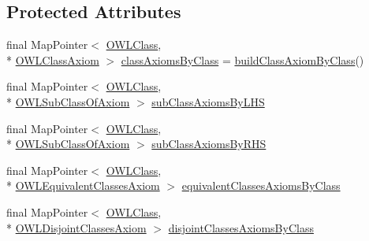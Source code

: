 \subsection*{Protected Attributes}
\begin{DoxyCompactItemize}
\item 
final Map\-Pointer$<$ \hyperlink{interfaceorg_1_1semanticweb_1_1owlapi_1_1model_1_1_o_w_l_class}{O\-W\-L\-Class}, \\*
\hyperlink{interfaceorg_1_1semanticweb_1_1owlapi_1_1model_1_1_o_w_l_class_axiom}{O\-W\-L\-Class\-Axiom} $>$ \hyperlink{classuk_1_1ac_1_1manchester_1_1cs_1_1owl_1_1owlapi_1_1_abstract_internals_impl_a3a600d063d1c9d76bd3a5fbb70aaff59}{class\-Axioms\-By\-Class} = \hyperlink{classuk_1_1ac_1_1manchester_1_1cs_1_1owl_1_1owlapi_1_1_abstract_internals_impl_a432bc10c49231eb4e30deec06401e08b}{build\-Class\-Axiom\-By\-Class}()
\item 
final Map\-Pointer$<$ \hyperlink{interfaceorg_1_1semanticweb_1_1owlapi_1_1model_1_1_o_w_l_class}{O\-W\-L\-Class}, \\*
\hyperlink{interfaceorg_1_1semanticweb_1_1owlapi_1_1model_1_1_o_w_l_sub_class_of_axiom}{O\-W\-L\-Sub\-Class\-Of\-Axiom} $>$ \hyperlink{classuk_1_1ac_1_1manchester_1_1cs_1_1owl_1_1owlapi_1_1_abstract_internals_impl_a114f0f04f66907f24cdfc6000e0925bc}{sub\-Class\-Axioms\-By\-L\-H\-S}
\item 
final Map\-Pointer$<$ \hyperlink{interfaceorg_1_1semanticweb_1_1owlapi_1_1model_1_1_o_w_l_class}{O\-W\-L\-Class}, \\*
\hyperlink{interfaceorg_1_1semanticweb_1_1owlapi_1_1model_1_1_o_w_l_sub_class_of_axiom}{O\-W\-L\-Sub\-Class\-Of\-Axiom} $>$ \hyperlink{classuk_1_1ac_1_1manchester_1_1cs_1_1owl_1_1owlapi_1_1_abstract_internals_impl_a7ea52a161f47ad10fea2017ee4d212fe}{sub\-Class\-Axioms\-By\-R\-H\-S}
\item 
final Map\-Pointer$<$ \hyperlink{interfaceorg_1_1semanticweb_1_1owlapi_1_1model_1_1_o_w_l_class}{O\-W\-L\-Class}, \\*
\hyperlink{interfaceorg_1_1semanticweb_1_1owlapi_1_1model_1_1_o_w_l_equivalent_classes_axiom}{O\-W\-L\-Equivalent\-Classes\-Axiom} $>$ \hyperlink{classuk_1_1ac_1_1manchester_1_1cs_1_1owl_1_1owlapi_1_1_abstract_internals_impl_ae7dd0a945d910d6d2b789bb882b9dc46}{equivalent\-Classes\-Axioms\-By\-Class}
\item 
final Map\-Pointer$<$ \hyperlink{interfaceorg_1_1semanticweb_1_1owlapi_1_1model_1_1_o_w_l_class}{O\-W\-L\-Class}, \\*
\hyperlink{interfaceorg_1_1semanticweb_1_1owlapi_1_1model_1_1_o_w_l_disjoint_classes_axiom}{O\-W\-L\-Disjoint\-Classes\-Axiom} $>$ \hyperlink{classuk_1_1ac_1_1manchester_1_1cs_1_1owl_1_1owlapi_1_1_abstract_internals_impl_abcecd94960d253655ea3558931d18d95}{disjoint\-Classes\-Axioms\-By\-Class}

\end{DoxyCompactItemize}
